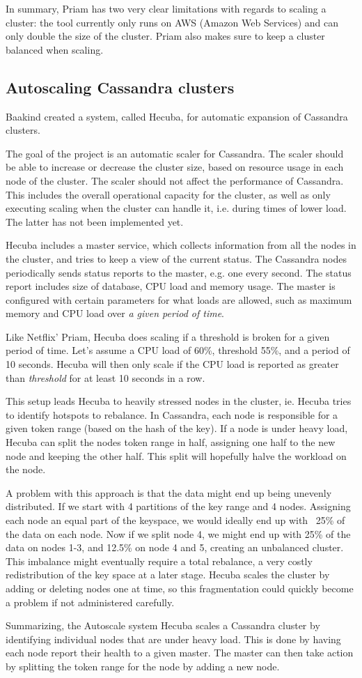 In summary, Priam has two very clear limitations with regards to scaling a cluster: the tool currently only runs on AWS (Amazon Web Services) and can only double the size of the cluster. Priam also makes sure to keep a cluster balanced when scaling.

\subsection{Autoscaling Cassandra clusters}

Baakind\cite{baakind} created a system, called Hecuba, for automatic expansion of Cassandra clusters.

The goal of the project is an automatic scaler for Cassandra. The scaler should be able to increase or decrease the cluster size, based on resource usage in each node of the cluster.
The scaler should not affect the performance of Cassandra. This includes the overall operational capacity for the cluster, as well as only executing scaling when the cluster can handle it, i.e. during times of lower load. The latter has not been implemented yet.

Hecuba includes a master service, which collects information from all the nodes in the cluster, and tries to keep a view of the current status. The Cassandra nodes periodically sends status reports to the master, e.g. one every second. The status report includes size of database, CPU load and memory usage. The master is configured with certain parameters for what loads are allowed, such as maximum memory and CPU load over \emph{a given period of time}.

Like Netflix' Priam, Hecuba does scaling if a threshold is broken for a given period of time. Let's assume a CPU load of 60\%, threshold 55\%, and a period of 10 seconds. Hecuba will then only scale if the CPU load is reported as greater than \emph{threshold} for at least 10 seconds in a row.

This setup leads Hecuba to heavily stressed nodes in the cluster, ie. Hecuba tries to identify hotspots to rebalance. 
In Cassandra, each node is responsible for a given token range (based on the hash of the key). If a node is under heavy load, Hecuba can split the nodes token range in half, assigning one half to the new node and keeping the other half. This split will hopefully halve the workload on the node.

A problem with this approach is that the data might end up being unevenly distributed. If we start with 4 partitions of the key range and 4 nodes. Assigning each node an equal part of the keyspace, we would ideally end up with ~25\% of the data on each node. Now if we split node 4, we might end up with 25\% of the data on nodes 1-3, and 12.5\% on node 4 and 5, creating an unbalanced cluster. This imbalance might eventually require a total rebalance, a very costly redistribution of the key space at a later stage. Hecuba scales the cluster by adding or deleting nodes one at time, so this fragmentation could quickly become a problem if not administered carefully.

Summarizing, the Autoscale system Hecuba scales a Cassandra cluster by identifying individual nodes that are under heavy load. This is done by having each node report their health to a given master. The master can then take action by splitting the token range for the node by adding a new node.




